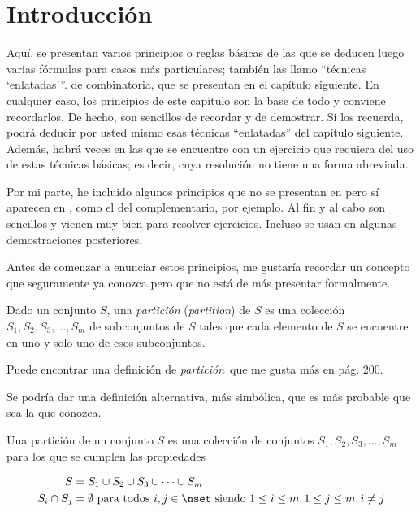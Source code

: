 




\section{Introducción}

Aquí, se presentan varios principios o reglas básicas de las que se deducen
luego varias fórmulas para casos más particulares; también las llamo
``técnicas {`enlatadas'}''. de combinatoria, que se presentan en el capítulo
siguiente. En cualquier caso, los principios de este capítulo son la base de
todo y conviene recordarlos. De hecho, son sencillos de recordar y de
demostrar. Si los recuerda, podrá deducir por usted mismo esas técnicas
``enlatadas'' del capítulo siguiente. Además, habrá veces en las que se
encuentre con un ejercicio que requiera del uso de estas técnicas básicas;
es decir, cuya resolución no tiene una forma abreviada.

Por mi parte, he incluido algunos principios que no se presentan en
\cite{bujalance-costa} pero sí aparecen en \cite{brualdi}, como el del
complementario, por ejemplo. Al fin y al cabo son sencillos y vienen muy
bien para resolver ejercicios. Incluso se usan en algunas demostraciones
posteriores.

Antes de comenzar a enunciar estos principios, me gustaría recordar un
concepto que seguramente ya conozca pero que no está de más presentar
formalmente.

\begin{deffinition}
  Dado un conjunto $S$, una \emph{partición} (\emph{partition}) de $S$ es una
  colección $S_1, S_2, S_3, \ldots, S_m$ de subconjuntos de $S$ tales que
  cada elemento de $S$ se encuentre en uno y solo uno de esos subconjuntos.
\end{deffinition}

Puede encontrar una definición de \emph{partición} que me gusta más en
\cite{newstead} pág. 200.

Se podría dar una definición alternativa, más simbólica, que es más probable
que sea la que conozca.

\begin{deffinition}
  Una partición de un conjunto $S$ es una colección de conjuntos $S_1, S_2,
  S_3, \ldots, S_m$ para los que se cumplen las propiedades

  \begin{alignat*}{2}
    S &= S_1 \cup S_2 \cup S_3 \cup \cdots \cup S_m \\
    S_i \cap S_j &= \emptyset \ \text{para todos} \ i, j \in \nset \
      \text{siendo} \ 1 \leq i \leq m, 1 \leq j \leq m, i \neq j
  \end{alignat*}
\end{deffinition}









